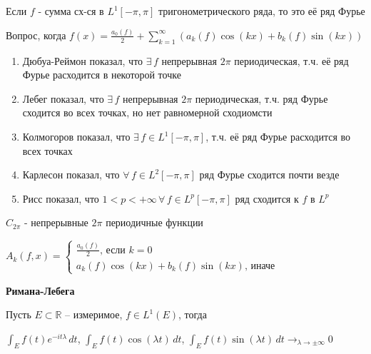 \begin{remark}
    Если $f$ - сумма сх-ся в $L^1 [-\pi, \pi]$ тригонометрического ряда, то это её ряд Фурье

    Вопрос, когда $f (x) = \frac{a_0 (f)}{2} + \sum_{k = 1}^\infty (a_k (f) \cos (kx) + b_k (f) \sin (kx))$

    \begin{enumerate}
        \item {
            Дюбуа-Реймон показал, что $\exists \, f$ непрерывная $2\pi$ периодическая, т.ч. её ряд Фурье расходится в некоторой точке
        }
        \item {
            Лебег показал, что $\exists \, f$ непрерывная $2\pi$ периодическая, т.ч. ряд Фурье сходится во всех точках, но нет равномерной сходиомсти
        }
        \item {
            Колмогоров показал, что $\exists \, f \in L^1 [-\pi, \pi]$, т.ч. её ряд Фурье расходится во всех точках
        }
        \item {
            Карлесон показал, что $\forall \, f \in L^2 [-\pi, \pi]$ ряд Фурье сходится почти везде
        }
        \item {
            Рисс показал, что $1 < p < +\infty \, \forall \, f \in L^p [-\pi, \pi]$ ряд сходится к $f$ в $L^p$
        }
    \end{enumerate}

    $C_{2\pi}$ - непрерывные $2\pi$ периодичные функции

    $A_k (f, x) = \begin{cases}
        \frac{a_0(f)}{2} \text{, если $k = 0$} \\
        a_k (f) \cos (kx) + b_k (f) \sin (kx) \text{, иначе}
    \end{cases}$
\end{remark}


\begin{lemma}
    \textbf{Римана-Лебега}

    Пусть $E \subset \mathbb{R}$ -- измеримое, $f \in L^1 (E)$, тогда

    $\int_E f(t) e^{-i t \lambda} \, dt$, $\int_E f(t) \cos (\lambda t) \, dt$, $\int_E f(t) \sin (\lambda t) \, dt \rightarrow_{\lambda \to \pm \infty} 0$
\end{lemma}


